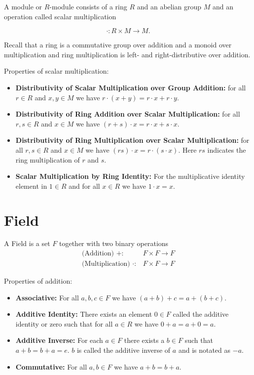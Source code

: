 \documentclass[12pt]{article}
\begin{document}
A module or $R$-module consists of a ring $R$ and an abelian group $M$ and an operation called scalar multiplication

$$
\cdot: R \times M \rightarrow M.
$$

Recall that a ring is a commutative group over addition and a monoid over multiplication and ring multiplication is left- and right-distributive over addition.

Properties of scalar multiplication:
\begin{itemize}
\item{\textbf{Distributivity of Scalar Multiplication over Group Addition:} for all $r \in R$ and $x, y \in M$ we have $r\cdot(x+y) = r\cdot x + r \cdot y$.}
\item{\textbf{Distributivity of Ring Addition over Scalar Multiplication:} for all $r, s \in R$ and $x\in M$ we have $(r+s)\cdot x = r\cdot x + s \cdot x$.}
\item{\textbf{Distributivity of Ring Multiplication over Scalar Multiplication:} for all $r, s\in R$ and $x\in M$ we have $(rs)\cdot x = r\cdot(s\cdot x)$. Here $rs$ indicates the ring multiplication of $r$ and $s$.}
\item{\textbf{Scalar Multiplication by Ring Identity:} For the multiplicative identity element in $1\in R$ and for all $x\in R$ we have $1\cdot x = x$.}
\end{itemize}

\section{Field}
A Field is a set $F$ together with two binary operations 
\begin{align}
\text{(Addition) } +:& F\times F \rightarrow F\\
\text{(Multiplication) } \cdot:& F\times F \rightarrow F
\end{align}

Properties of addition: 
\begin{itemize}
\item{\textbf{Associative:} For all $a, b, c \in F$ we have $(a+b)+c = a+(b+c)$.}
\item{\textbf{Additive Identity:} There exists an element $0\in F$ called the additive identity or zero such that for all $a \in R$ we have $0+a = a+0 = a$.}
\item{\textbf{Additive Inverse:} For each $a\in F$ there exists a $b \in F$ such that $a + b = b + a = e$. $b$ is called the additive inverse of $a$ and is notated as $-a$.}
\item{\textbf{Commutative:} For all $a, b \in F$ we have $a+b = b+a$.}
\end{itemize}
\end{document}
